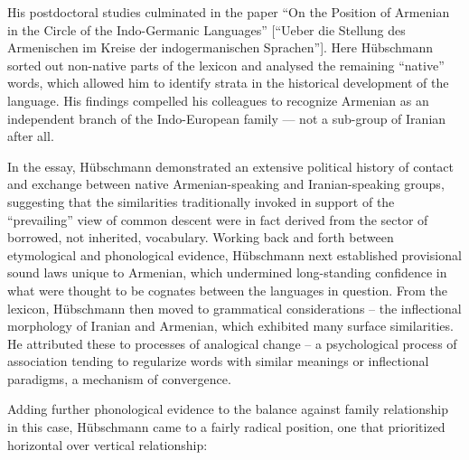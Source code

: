 \documentclass[output=paper]{langscibook}
\begin{document}
His postdoctoral studies culminated in the \citeyear{Huebschmann1875} paper ``On the Position of Armenian in the Circle of the Indo-Germanic Languages'' [``Ueber die Stellung des Armenischen im Kreise der indogermanischen Sprachen'']. Here Hübschmann sorted out non-native parts of the lexicon and analysed the remaining ``native'' words, which allowed him to identify strata in the historical development of the language. His findings compelled his colleagues to recognize Armenian as an independent branch of the Indo-European family — not a sub-group of Iranian after all.

In the \citeyear{Huebschmann1875} essay, Hübschmann demonstrated an extensive political history of contact and exchange between native Armenian-speaking and Iranian-speaking groups, suggesting that the similarities traditionally invoked in support of the ``prevailing'' view of common descent were in fact derived from the sector of borrowed, not inherited, vocabulary. Working back and forth between etymological and phonological evidence, Hübschmann next established provisional sound laws unique to Armenian, which undermined long-standing confidence in what were thought to be cognates between the languages in question. From the lexicon, Hübschmann then moved to grammatical considerations -- the inflectional morphology of Iranian and Armenian, which exhibited many surface similarities. He attributed these to processes of analogical change -- a psychological process of association tending to regularize words with similar meanings or inflectional paradigms, a mechanism of convergence.

Adding further phonological evidence to the balance against family relationship in this case, Hübschmann came to a fairly radical position, one that prioritized horizontal over vertical relationship:
\end{document}
